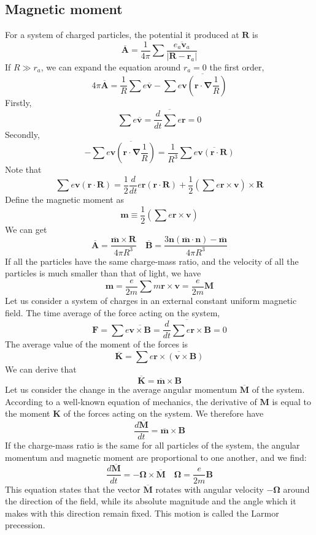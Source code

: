 \subsection{Magnetic moment}
For a system of charged particles, the potential it produced at $\bm{R}$ is
\[\overline{\bm{A}} = \frac{1}{4\pi} \sum \overline{\frac{e_a \bm{v}_a}{|\bm{R}-\bm{r}_a|}}\]
If $R \gg r_a$, we can expand the equation around $r_a=0$ the first order,
\[4\pi \overline{\bm{A}} = \frac{1}{R} \sum e \overline{\bm{v}} - \sum \overline{e \bm{v} \left( \bm{r} \cdot \bm{\nabla} \frac{1}{R}\right)}\]
Firstly,
\[\sum e \overline{\bm{v}} = \overline{\frac{d}{dt} \sum e \bm{r}} = 0\]
Secondly,
\[-\sum \overline{e \bm{v} \left( \bm{r} \cdot \bm{\nabla} \frac{1}{R}\right)} = \frac{1}{R^3} \sum \overline{e\bm{v} (\bm{r} \cdot \bm{R})}\]
Note that
\[\sum e\bm{v} (\bm{r} \cdot \bm{R}) = \frac{1}{2} \frac{d}{dt} e\bm{r}(\bm{r}\cdot\bm{R}) + \frac{1}{2} \left(\sum e \bm{r} \times \bm{v}\right) \times \bm{R}\]
Define the magnetic moment as
\[\bm{m} \equiv \frac{1}{2} \left(\sum e \bm{r} \times \bm{v}\right)\]
We can get
\[\overline{\bm{A}} = \frac{\overline{\bm{m}} \times \bm{R}}{4\pi R^3} \quad \overline{\bm{B}} = \frac{3\bm{n}(\overline{\bm{m}} \cdot \bm{n})-\overline{\bm{m}}}{4\pi R^3}\]
If all the particles have the same charge-mass ratio, and the velocity of all the particles is much smaller than that of light, we have
\[\bm{m} = \frac{e}{2m} \sum m \bm{r} \times \bm{v} = \frac{e}{2m} \bm{M}\]
Let us consider a system of charges in an external constant uniform magnetic field. The time average of the force acting on the system, 
\[\bm{F} = \sum e \overline{\bm{v} \times \bm{B}} = \overline{\frac{d}{dt} \sum e \bm{r} \times \bm{B}} = 0\]
The average value of the moment of the forces is 
\[\overline{\bm{K}} = \sum e \overline{\bm{r} \times (\bm{v} \times \bm{B})}\]
We can derive that
\[\overline{\bm{K}} = \overline{\bm{m}} \times \bm{B}\]
Let us consider the change in the average angular momentum $\overline{\bm{M}}$ of the system. According to a well-known equation of mechanics, the derivative of $\bm{M}$ is equal to the moment $\bm{K}$ of the forces acting on the system. We therefore have
\[\frac{d \overline{\bm{M}}}{dt} = \overline{\bm{m}} \times \bm{B}\]
If the charge-mass ratio is the same for all particles of the system, the angular momentum and magnetic moment are proportional to one another, and we find:
\[\frac{d \overline{\bm{M}}}{dt} = - \bm{\Omega} \times \overline{\bm{M}} \quad \bm{\Omega} = \frac{e}{2m} \bm{B}\]
This equation states that the vector $\overline{\bm{M}}$ rotates with angular velocity $-\bm{\Omega}$ around the direction of the field, while its absolute magnitude and the angle which it makes with this direction remain fixed. This motion is called the Larmor precession.

